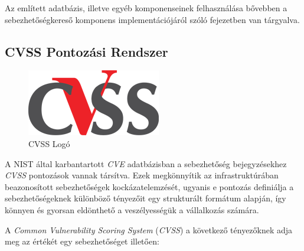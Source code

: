 \documentclass[a4paper,12pt]{article}
\begin{document}
	Az említett adatbázis, illetve egyéb komponenseinek felhasználása bővebben a sebezhetőségkereső komponens implementációjáról szóló fejezetben van tárgyalva.
	
\subsection{CVSS Pontozási Rendszer} \label{ssec:cvss}
	
	\begin{figure}
		\vspace{-10pt}
		\centering
		\includegraphics[scale=0.4]{cvss.png}
		\caption{CVSS Logó}
	\end{figure}
	
	A NIST által karbantartott \textit{CVE} adatbázisban a sebezhetőség bejegyzésekhez \textit{CVSS} pontozások vannak társítva. Ezek megkönnyítik az infrastruktúrában beazonosított sebezhetőségek kockázatelemzését, ugyanis e pontozás definiálja a sebezhetőségeknek különböző tényezőit egy strukturált formátum alapján, így könnyen és gyorsan eldönthető a veszélyességük a vállalkozás számára.
	
	A \textit{Common Vulnerability Scoring System}\cite{cvssv2} (\textit{CVSS}) a következő tényezőknek adja meg az értékét egy sebezhetőséget illetően:
	
\end{document}
